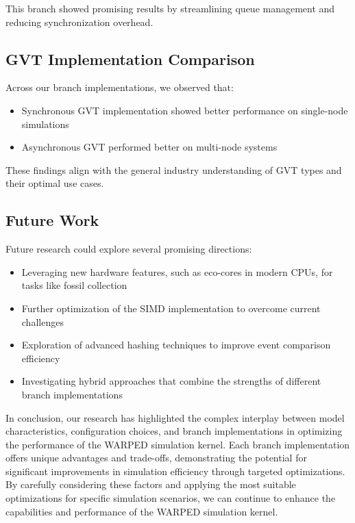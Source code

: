 This branch showed promising results by streamlining queue management and reducing synchronization overhead.

\subsection{GVT Implementation Comparison}

Across our branch implementations, we observed that:

\begin{itemize}
    \item Synchronous GVT implementation showed better performance on single-node simulations
    \item Asynchronous GVT performed better on multi-node systems
\end{itemize}

These findings align with the general industry understanding of GVT types and their optimal use cases.

\subsection{Future Work}

Future research could explore several promising directions:

\begin{itemize}
    \item Leveraging new hardware features, such as eco-cores in modern CPUs, for tasks like fossil collection
    \item Further optimization of the SIMD implementation to overcome current challenges
    \item Exploration of advanced hashing techniques to improve event comparison efficiency
    \item Investigating hybrid approaches that combine the strengths of different branch implementations
\end{itemize}

In conclusion, our research has highlighted the complex interplay between model characteristics, configuration choices, and branch implementations in optimizing the performance of the WARPED simulation kernel. Each branch implementation offers unique advantages and trade-offs, demonstrating the potential for significant improvements in simulation efficiency through targeted optimizations. By carefully considering these factors and applying the most suitable optimizations for specific simulation scenarios, we can continue to enhance the capabilities and performance of the WARPED simulation kernel.
\newpage
